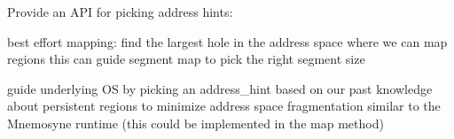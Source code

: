 
\begin{DoxyRefList}
\item[\label{todo__todo000001}%
\hypertarget{todo__todo000001}{}%
Class \hyperlink{classalps_1_1MemoryManager}{alps\+:\+:Memory\+Manager} ]Provide an A\+PI for picking address hints\+:
\begin{DoxyItemize}
\item best effort mapping\+: find the largest hole in the address space where we can map regions this can guide segment map to pick the right segment size
\item guide underlying OS by picking an address\+\_\+hint based on our past knowledge about persistent regions to minimize address space fragmentation similar to the Mnemosyne runtime (this could be implemented in the map method) 
\end{DoxyItemize}
\end{DoxyRefList}